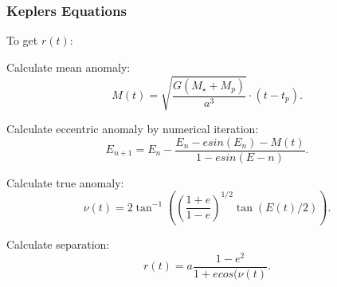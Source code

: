 \documentclass[show notes]{beamer}
\begin{document}
\begin{frame}
\frametitle{Keplers Equations}	

To get $r(t)$:

Calculate mean anomaly:
\begin{equation*}
M(t) = \sqrt{\frac{G (M_\star + M_p)}{a^3}} \cdot (t - t_p).
\end{equation*}

Calculate eccentric anomaly by numerical iteration:
\begin{equation*}
E_{n+1} = E_n - \frac{E_n - e sin(E_n) - M(t)}{1 - e sin(E-n)}.
\end{equation*}

Calculate true anomaly:
\begin{equation*}
\nu(t) = 2 \tan^{-1}( \left(\frac{1+e}{1-e}\right)^{1/2} \tan(E(t)/2) ).
\end{equation*}

Calculate separation:
\begin{equation*}
r(t) = a \frac{1 - e^2}{1 + e cos(\nu(t)}.
\end{equation*}

\end{frame}
\end{document}
